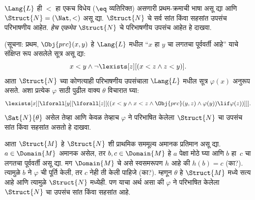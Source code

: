 \begin{prob}
$\Lang{L}$ ही $<$ हा एकच विधेय
($\eq$ व्यतिरिक्त) असणारी प्रथम-क्रमाची
भाषा असू द्या आणि
$\Struct{N} = (\Nat, <)$ असू द्या.
$\Struct{N}$ चे सर्व सांत किंवा सहसांत
उपसंच परिभाषणीय आहेत. \emph{हेच एकमेव}
$\Struct{N}$ चे परिभाषणीय उपसंच आहेत हे दाखवा.

(सूचना: प्रथम, $\Obj{prc}(x,y)$ हे
$\Lang{L}$ मधील “$x$ हा $y$ चा लगतचा
पूर्ववर्ती आहे” याचे संक्षिप्त रूप असलेले
सूत्र असू द्या:
\[
x<y \land \lnot \lexists[z][(x<z \land z < y)].
\]
आता $\Struct{N}$ च्या कोणत्याही परिभाषणीय
उपसंचाला $\Lang{L}$ मधील सूत्र $\varphi(x)$
अनुरूप असते. अशा प्रत्येक $\varphi$ साठी
पुढील वाक्य $\theta$ विचारात घ्या:
\[
\lexists[x][\lforall[y][\lforall[z][((x<y \land x<z \land \Obj{prc}(y,z)
  \land \varphi(y)) \lif \varphi(z))]]].
\]
$\Sat{N}{\theta}$ असेल तेव्हा आणि केवळ
तेव्हाच $\varphi$ ने परिभाषित केलेला
$\Struct{N}$ चा उपसंच सांत किंवा
सहसांत असतो हे दाखवा.

आता $\Struct{M}$ हे $\Struct{N}$
शी प्राथमिक सममूल्य अमानक प्रतिमान असू द्या.
$a \in \Domain{M}$ अमानक असेल, तर
$b, c \in \Domain{M}$ हे $a$ पेक्षा
मोठे घ्या आणि $b$ हा~$c$ चा लगतचा
पूर्ववर्ती असू द्या. मग $\Domain{M}$
चे असे स्वसमरूपण $h$ आहे की $h(b)=c$
(का?). त्यामुळे $b$ ने $\varphi$ ची पूर्ति
केली, तर $c$ नेही ती केली पाहिजे (का?).
म्हणून $\theta$ हे $\Struct{M}$ मध्ये सत्य
आहे आणि त्यामुळे $\Struct{N}$ मध्येही.
पण याचा अर्थ असा की $\varphi$ ने परिभाषित
केलेला $\Struct{N}$ चा उपसंच सांत
किंवा सहसांत आहे.
\end{prob}



